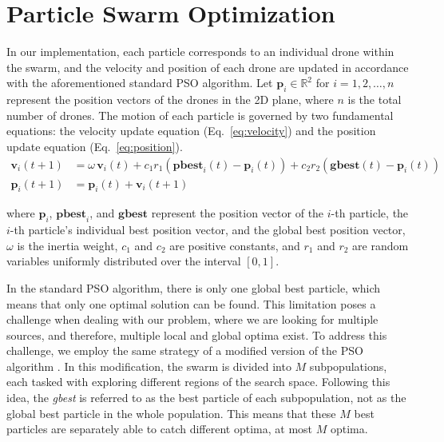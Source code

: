\section{Particle Swarm Optimization}
\par In our implementation, each particle corresponds to an individual drone 
within the swarm, and the velocity and position of each drone are updated in 
accordance with the aforementioned standard PSO algorithm. Let $\mathbf{p}_i \in \mathbb{R}^2$ 
for $i = 1, 2, \dots, n$ represent the position vectors of the drones in the 2D plane, 
where $n$ is the total number of drones. The motion of each particle is governed 
by two fundamental equations: the velocity update equation (Eq.~\ref{eq:velocity}) and 
the position update equation (Eq.~\ref{eq:position}).
\begin{align}
    \mathbf{v}_{i}(t+1) &= \omega \, \mathbf{v}_{i}(t) + c_1 r_1 \left( \mathbf{pbest}_{i}(t) - \mathbf{p}_{i}(t) \right) 
    + c_2 r_2 \left( \mathbf{gbest}(t) - \mathbf{p}_{i}(t) \right) \label{eq:velocity} \\
    \mathbf{p}_{i}(t+1) &= \mathbf{p}_{i}(t) + \mathbf{v}_{i}(t+1) \label{eq:position}
\end{align}
    
where $\mathbf{p}_i$, $\mathbf{pbest}_i$, and $\mathbf{gbest}$ represent the position vector of the $i$-th particle, 
the $i$-th particle's individual best position vector, and the global best position vector, 
$\omega$ is the inertia weight, $c_1$ and $c_2$ are positive constants, and
$r_1$ and $r_2$ are random variables uniformly distributed over the interval $[0, 1]$.

\par In the standard PSO algorithm, there is only one global best particle, 
which means that only one optimal solution can be found. This limitation 
poses a challenge when dealing with our problem, where we are looking for multiple sources, 
and therefore, multiple local and global optima exist. To address this challenge, 
we employ the same strategy of a modified version of the PSO algorithm \cite{PSO_IMPORTANT}. 
In this modification, the swarm is divided into $M$ subpopulations, each tasked with exploring 
different regions of the search space. Following this idea, the \textit{gbest} is referred to as 
the best particle of each subpopulation, not as the global best particle in the whole population. 
This means that these $M$ best particles are separately able to catch different optima, at most $M$ optima.

